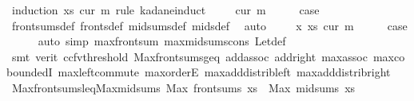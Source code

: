 \begin{isabellebody}
%
\isadelimproof
%
\endisadelimproof
%
\isatagproof
{}\isamarkupfalse%
\ {\isacharparenleft}{\kern0pt}induction\ xs\ cur\ m\ rule{\isacharcolon}{\kern0pt}\ kadane{\isachardot}{\kern0pt}induct{\isacharparenright}{\kern0pt}\isanewline
\ \ \isamarkupfalse%
\ {\isacharparenleft}{\kern0pt}{}\ cur\ m{\isacharparenright}{\kern0pt}\isanewline
\ \ \isamarkupfalse%
\ \isamarkupfalse%
\ {\isacharquery}{\kern0pt}case\ \isamarkupfalse%
\ front{\isacharunderscore}{\kern0pt}sums{\isacharunderscore}{\kern0pt}def\ fronts{\isacharunderscore}{\kern0pt}def\ mid{\isacharunderscore}{\kern0pt}sums{\isacharunderscore}{\kern0pt}def\ mids{\isacharunderscore}{\kern0pt}def\ \isamarkupfalse%
\ auto\isanewline
{}\isamarkupfalse%
\isanewline
\ \ \isamarkupfalse%
\ {\isacharparenleft}{\kern0pt}{}\ x\ xs\ cur\ m{\isacharparenright}{\kern0pt}\isanewline
\ \ \isamarkupfalse%
\ \isamarkupfalse%
\ {\isacharquery}{\kern0pt}case\isanewline
\ \ \ \ \isamarkupfalse%
\ {\isacharparenleft}{\kern0pt}auto\ simp{\isacharcolon}{\kern0pt}\ max{\isacharunderscore}{\kern0pt}front{\isacharunderscore}{\kern0pt}sum\ max{\isacharunderscore}{\kern0pt}mid{\isacharunderscore}{\kern0pt}sums{\isacharunderscore}{\kern0pt}cons\ Let{\isacharunderscore}{\kern0pt}def{\isacharparenright}{\kern0pt}\isanewline
\ \ \ \ \isamarkupfalse%
\ {\isacharparenleft}{\kern0pt}smt\ {\isacharparenleft}{\kern0pt}verit{\isacharcomma}{\kern0pt}\ ccfv{\isacharunderscore}{\kern0pt}threshold{\isacharparenright}{\kern0pt}\ Max{\isacharunderscore}{\kern0pt}front{\isacharunderscore}{\kern0pt}sums{\isacharunderscore}{\kern0pt}geq{\isacharunderscore}{\kern0pt}{}\ add{\isacharunderscore}{\kern0pt}assoc\ add{\isacharunderscore}{\kern0pt}{}{\isacharunderscore}{\kern0pt}right\ max{\isachardot}{\kern0pt}assoc\ max{\isachardot}{\kern0pt}coboundedI{}\ max{\isachardot}{\kern0pt}left{\isacharunderscore}{\kern0pt}commute\ max{\isachardot}{\kern0pt}orderE\ max{\isacharunderscore}{\kern0pt}add{\isacharunderscore}{\kern0pt}distrib{\isacharunderscore}{\kern0pt}left\ max{\isacharunderscore}{\kern0pt}add{\isacharunderscore}{\kern0pt}distrib{\isacharunderscore}{\kern0pt}right{\isacharparenright}{\kern0pt}\isanewline
{}\isamarkupfalse%
%
\endisatagproof
{\isafoldproof}%
%
\isadelimproof
\isanewline
%
\endisadelimproof
\isanewline
{}\isamarkupfalse%
\ Max{\isacharunderscore}{\kern0pt}front{\isacharunderscore}{\kern0pt}sums{\isacharunderscore}{\kern0pt}leq{\isacharunderscore}{\kern0pt}Max{\isacharunderscore}{\kern0pt}mid{\isacharunderscore}{\kern0pt}sums{\isacharcolon}{\kern0pt}\ {\isachardoublequoteopen}Max\ {\isacharparenleft}{\kern0pt}front{\isacharunderscore}{\kern0pt}sums\ xs{\isacharparenright}{\kern0pt}\ {\isasymle}\ Max\ {\isacharparenleft}{\kern0pt}mid{\isacharunderscore}{\kern0pt}sums\ xs{\isacharparenright}{\kern0pt}{\isachardoublequoteclose}\isanewline

\end{isabellebody}
